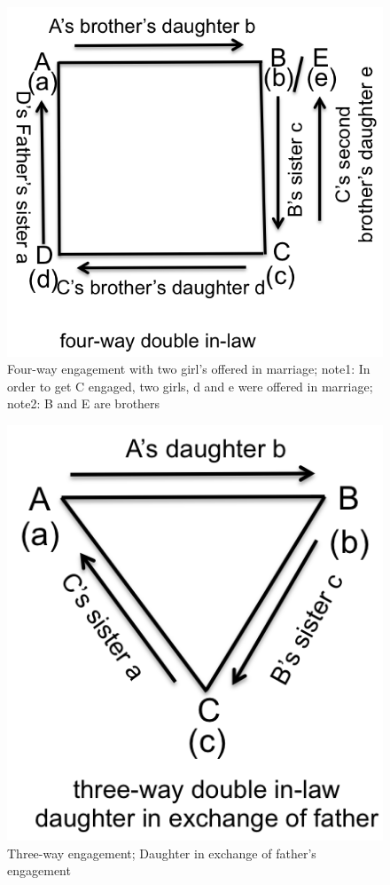 \begin{figure}
\center
\includegraphics{figures/engagement/four_5}
\caption{Four-way engagement with two girl's offered in marriage; note1: In order to get C engaged, two girls, d and e were offered in marriage; note2: B and E are brothers
\label{figure:engage_5}}
\end{figure}

\begin{figure}
\center
\includegraphics{figures/engagement/triple_6}
\caption{Three-way engagement; Daughter in exchange of father's engagement
\label{figure:engage_6}}
\end{figure}

